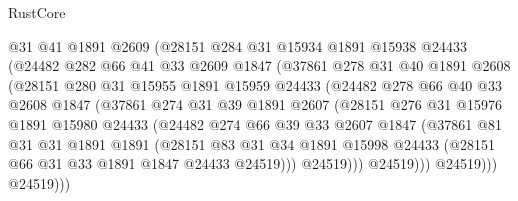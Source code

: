 \begin{lexlean}{RustCore}
\begin{coremodule}
                  @31
                  @41
                  @1891
                  @2609
                  (@28151
                    @284
                    @31
                    @15934
                    @1891
                    @15938
                    @24433
                    (@24482
                      @282
                      @66
                      @41
                      @33
                      @2609
                      @1847
                      (@37861
                        @278
                        @31
                        @40
                        @1891
                        @2608
                        (@28151
                          @280
                          @31
                          @15955
                          @1891
                          @15959
                          @24433
                          (@24482
                            @278
                            @66
                            @40
                            @33
                            @2608
                            @1847
                            (@37861
                              @274
                              @31
                              @39
                              @1891
                              @2607
                              (@28151
                                @276
                                @31
                                @15976
                                @1891
                                @15980
                                @24433
                                (@24482
                                  @274
                                  @66
                                  @39
                                  @33
                                  @2607
                                  @1847
                                  (@37861
                                    @81
                                    @31
                                    @31
                                    @1891
                                    @1891
                                    (@28151
                                      @83
                                      @31
                                      @34
                                      @1891
                                      @15998
                                      @24433
                                      (@28151 @66 @31 @33 @1891 @1847 @24433 @24519)))
                                  @24519)))
                            @24519)))
                      @24519)))
                @24519)))

\end{coremodule}
\end{lexlean}
